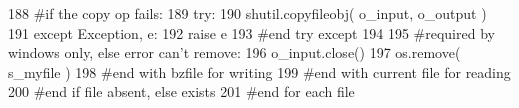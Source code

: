 \begin{DoxyCode}
188                         \textcolor{comment}{#if the copy op fails:}
189                         \textcolor{keywordflow}{try}: 
190                             shutil.copyfileobj( o\_input, o\_output )
191                         \textcolor{keywordflow}{except} Exception,  e:
192                             \textcolor{keywordflow}{raise} e
193                         \textcolor{comment}{#end try except}
194 
195                         \textcolor{comment}{#required by windows only, else error can't remove:}
196                         o\_input.close()
197                         os.remove( s\_myfile )   
198                     \textcolor{comment}{#end with bzfile for writing}
199                 \textcolor{comment}{#end with current file for reading}
200             \textcolor{comment}{#end if file absent, else exists}
201         \textcolor{comment}{#end for each file}
\end{DoxyCode}
